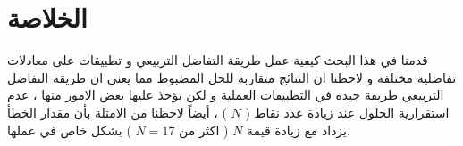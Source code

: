 \chapter*{الخلاصة }
قدمنا في هذا البحث كيفية عمل طريقة التفاضل التربيعي و تطبيقات على معادلات تفاضلية مختلفة و لاحظنا ان النتائج متقاربة للحل المضبوط مما يعني ان طريقة التفاضل التربيعي طريقة جيدة في التطبيقات العملية و لكن يؤخذ عليها بعض الامور منها ، عدم استقرارية الحلول عند زيادة عدد نقاط ( $N$ ) ، أيضاً لاحظنا من الامثلة بأن مقدار الخطأ يزداد مع زيادة قيمة $N$ ( اكثر من $N=17$ ) بشكل خاص في عملها.